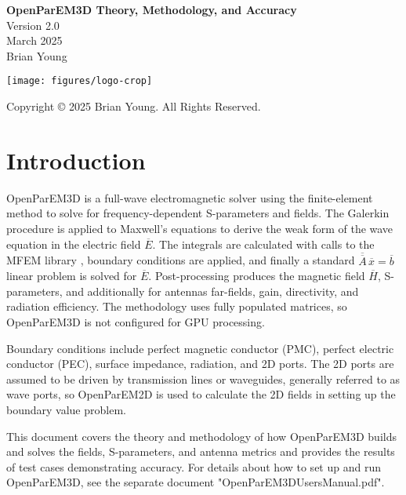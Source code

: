 \documentclass[titlepage]{article}
\renewcommand\_{\textunderscore\linebreak[1]}
\begin{document}
\begin{titlepage}

   \centering
   \vspace*{3cm}
   {\huge\bfseries OpenParEM3D Theory, Methodology, and Accuracy} \\
   \vskip1cm
   {\Large Version 2.0} \\
   \vskip1cm
   {\Large March 2025} \\
   \vskip1cm
   {\Large Brian Young} \\

   \vfill

   \texttt{[image: figures/logo-crop]}

   \vspace*{\fill}
   Copyright \copyright{} 2025 Brian Young. All Rights Reserved.
\end{titlepage}

\tableofcontents

\newpage
\section{Introduction}

OpenParEM3D is a full-wave electromagnetic solver using the finite-element method to solve for frequency-dependent S-parameters and fields.  The Galerkin procedure is applied to Maxwell's equations to derive the weak form of the wave equation in the electric field $\overline{E}$.  The integrals are calculated with calls to the MFEM library \cite{MFEM}\cite{MFEMweb}, boundary conditions are applied, and finally a standard $\overline{\overline{A}}\,\overline{x}=\overline{b}$ linear problem is solved for $\overline{E}$.  Post-processing produces the magnetic field $\overline{H}$, S-parameters, and additionally for antennas far-fields, gain, directivity, and radiation efficiency.  The methodology uses fully populated matrices, so OpenParEM3D is not configured for GPU processing.

Boundary conditions include perfect magnetic conductor (PMC), perfect electric conductor (PEC), surface impedance, radiation, and 2D ports.  The 2D ports are assumed to be driven by transmission lines or waveguides, generally referred to as wave ports, so OpenParEM2D is used to calculate the 2D fields in setting up the boundary value problem.

This document covers the theory and methodology of how OpenParEM3D builds and solves the fields, S-parameters, and antenna metrics and provides the results of test cases demonstrating accuracy.  For details about how to set up and run OpenParEM3D, see the separate document "OpenParEM3D\_Users\_Manual.pdf".
\end{document}
